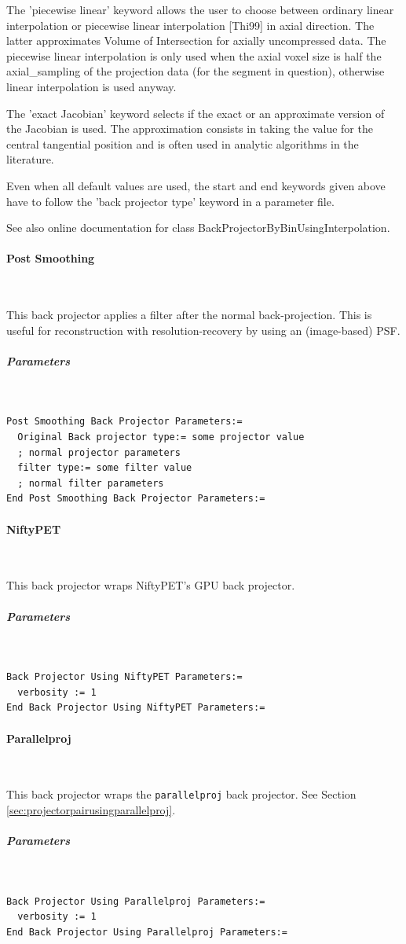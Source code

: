 \documentclass{article}
\newcommand{\subsubsubsection}[1]{\paragraph{#1}\mbox{} \\}
\newcommand{\subsubsubsubsection}[1]{\subparagraph{#1} \mbox{} \\}
\begin{document}
{{The 'piecewise linear' keyword allows the user to choose between 
ordinary linear interpolation or piecewise linear interpolation 
[Thi99] in axial direction. The latter approximates Volume of 
Intersection for axially uncompressed data. The piecewise linear 
interpolation is only used when the axial voxel size is half 
the axial\_sampling of the projection data (for the segment in 
question), otherwise linear interpolation is used anyway.


The 'exact Jacobian' keyword selects if the exact or an approximate 
version of the Jacobian is used. The approximation consists in 
taking the value for the central tangential position and is often 
used in analytic algorithms in the literature.


Even when all default values are used, the start and end keywords 
given above have to follow the 'back projector type' keyword 
in a parameter file.


See also online documentation for class BackProjectorByBinUsingInterpolation.

{ \subsubsubsection{Post Smoothing}
}
This back projector applies a filter after the normal back-projection.
This is useful for reconstruction with resolution-recovery 
by using an (image-based) PSF.

{ \subsubsubsubsection{Parameters}
}
\begin{verbatim}
Post Smoothing Back Projector Parameters:=
  Original Back projector type:= some projector value 
  ; normal projector parameters
  filter type:= some filter value
  ; normal filter parameters
End Post Smoothing Back Projector Parameters:=
\end{verbatim}

{ \subsubsubsection{NiftyPET}
}
This back projector wraps NiftyPET's GPU back projector.

{ \subsubsubsubsection{Parameters}
}
\begin{verbatim}
Back Projector Using NiftyPET Parameters:=
  verbosity := 1
End Back Projector Using NiftyPET Parameters:=
\end{verbatim}

{ \subsubsubsection{Parallelproj}
}
This back projector wraps the \texttt{parallelproj} back projector.
See Section \ref{sec:projectorpairusingparallelproj}.

{ \subsubsubsubsection{Parameters}
}
\begin{verbatim}
Back Projector Using Parallelproj Parameters:=
  verbosity := 1
End Back Projector Using Parallelproj Parameters:=
\end{verbatim}

}}
\end{document}
